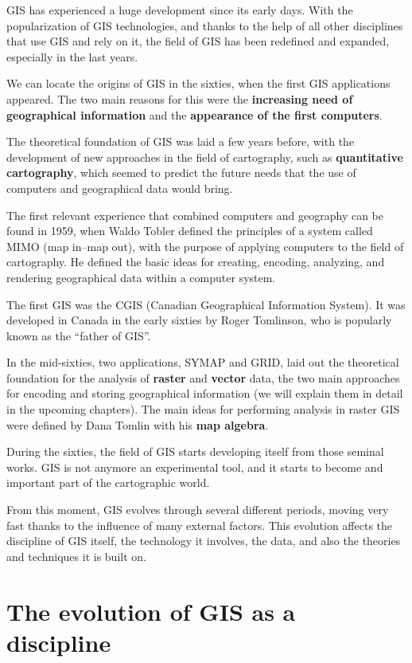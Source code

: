 GIS has experienced a huge development since its early days. With the popularization of GIS technologies, and thanks to the help of all other disciplines that use GIS and rely on it, the field of GIS has been redefined and expanded, especially in the last years.

We can locate the origins of GIS in the sixties, when the first GIS applications appeared. The two main reasons for this were the \textbf{increasing need of geographical information} and the \textbf{appearance of the first computers}.

The theoretical foundation of GIS was laid a few years before, with the development of new approaches in the field of cartography, such as \textbf{quantitative cartography}, which seemed to predict the future needs that the use of computers and geographical data would bring.

The first relevant experience that combined computers and geography can be found in 1959, when Waldo Tobler defined the principles of a system called MIMO (map in--map out), with the purpose of applying computers to the field of cartography. He defined the basic ideas for creating, encoding, analyzing, and rendering geographical data within a computer system.

The first GIS was the CGIS (Canadian Geographical Information System). It was developed in Canada in the early sixties by Roger Tomlinson, who is popularly known as the ``father of GIS''.

In the mid-sixties, two applications, SYMAP and GRID, laid out the theoretical foundation for the analysis of \textbf{raster} and \textbf{vector} data, the two main approaches for encoding and storing geographical information (we will explain them in detail in the upcoming chapters). The main ideas for performing analysis in raster GIS were defined by Dana Tomlin with his \textbf{map algebra}.

During the sixties, the field of GIS starts developing itself from those seminal works. GIS is not anymore an experimental tool, and it starts to become and important part of the cartographic world.

From this moment, GIS evolves through several different periods, moving very fast thanks to the influence of many external factors. This evolution affects the discipline of GIS itself, the technology it involves, the data, and also the theories and techniques it is built on.



\section{The evolution of GIS as a discipline}


